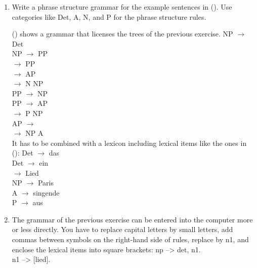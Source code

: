 \begin{enumerate}
\begin{figure}
\caption{Analysis of \emph{das ein Lied singende Kind aus dem Allgäu} `the child from the Allgäu
  singing a song'}
\end{figure}

\item Write a phrase structure grammar for the example sentences in (). Use categories like
  Det, A, N, and P for the phrase structure rules.

() shows a grammar that licenses the trees of the previous exercise. 
\ea
NP $\to$ Det \nbar\\
NP $\to$ \nbar PP\\
\nbar $\to$ \nbar PP\\
\nbar $\to$ AP \nbar\\
\nbar $\to$ N NP\\
%
PP $\to$ NP \pbar\\
PP $\to$ AP \pbar\\
\pbar $\to$ P NP\\
%
AP $\to$ \abar\\
\abar $\to$ NP A\\
%
\z
It has to be combined with a lexicon including lexical items like the ones in ():
\ea
Det $\to$ das\\
Det $\to$ ein\\
\nbar $\to$ Lied\\
NP $\to$ Paris\\
A $\to$ singende\\
P $\to$ aus\\
\z
\item The grammar of the previous exercise can be entered into the computer more or less
  directly. You have to replace capital letters by small letters, add commas between symbols on the
  right-hand side of rules, replace \nbar by n1, and enclose the lexical items into square brackets:
\ea
np --> det, n1.\\
n1 --> [lied].\\
\z
\end{enumerate}
\clearpage

